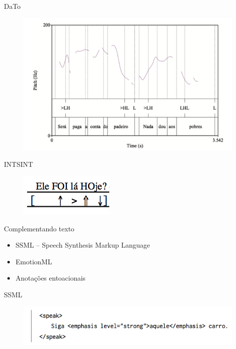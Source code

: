 \documentclass{beamer}
\begin{document}
\begin{frame}{DaTo}
    \begin{figure}
      \includegraphics[scale=0.40]{dato.png}
    \end{figure}
\end{frame}

\begin{frame}{INTSINT}
    \begin{figure}
      \includegraphics[scale=0.80]{intsint.png}
    \end{figure}
\end{frame}

\begin{frame}{Complementando texto}
  \begin{itemize}
  \item SSML -- Speech Synthesis Markup Language
  \item EmotionML
  \item Anotações entoacionais
  \end{itemize}
\end{frame}

\begin{frame}{SSML}
    \begin{figure}
      \includegraphics[scale=0.60]{ssml.png}
    \end{figure}
\end{frame}
\end{document}
